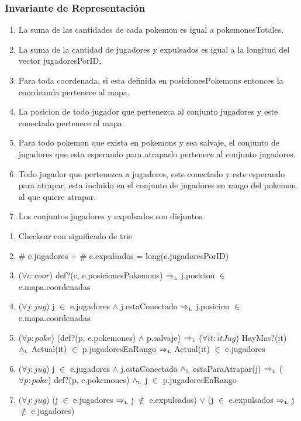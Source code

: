 \begin{Representacion}
\subsubsection{Invariante de Representación}
	\begin{enumerate}
		\item La suma de las cantidades de cada pokemon es igual a pokemonesTotales.
		\item La suma de la cantidad de jugadores y expulsados es igual a la longitud del vector jugadoresPorID.
		\item Para toda coordenada, si esta definida en posicionesPokemons entonces la coordeanda pertenece al mapa.
		\item La posicion de todo jugador que pertenezca al conjunto jugadores y este conectado pertenece al mapa.
		\item Para todo pokemon que exista en pokemons y sea salvaje, el conjunto de jugadores que esta esperando para atraparlo pertenece al conjunto jugadores.
		\item Todo jugador que pertenezca a jugadores, este conectado y este esperando para atrapar, esta incluido en el conjunto de jugadores en rango del pokemon al que quiere atrapar.
		\item Los conjuntos jugadores y expulsados son disjuntos.
	\end{enumerate}
	
	\begin{enumerate}
		\item Checkear con significado de trie
		\item \# e.jugadores + \# e.expulsados = long(e.jugadoresPorID)
		\item ($\forall c : coor$) def?(c, e.posicionesPokemons) $\Rightarrow_{\mathrm{\scriptscriptstyle{L}}}$ j.posicion $\in$ e.mapa.coordenadas
		\item ($\forall j : jug$) j $\in$ e.jugadores $\land$ j.estaConectado $\Rightarrow_{\mathrm{\scriptscriptstyle{L}}}$ j.posicion $\in$ e.mapa.coordenadas
		\item ($\forall p : poke$) (def?(p, e.pokemones) $\land$ p.salvaje) $\Rightarrow_{\mathrm{\scriptscriptstyle{L}}}$ ($\forall it : itJug$) HayMas?(it) $\land_{\mathrm{\scriptscriptstyle{L}}}$ Actual(it) $\in$ p.jugadoresEnRango $\Rightarrow_{\mathrm{\scriptscriptstyle{L}}}$ Actual(it) $\in$ e.jugadores
		\item ($\forall j : jug$) j $\in$ e.jugadores $\land$ j.estaConectado $\land_{\mathrm{\scriptscriptstyle{L}}}$ estaParaAtrapar(j) $\Rightarrow_{\mathrm{\scriptscriptstyle{L}}}$ ($\forall p : poke$) def?(p, e.pokemones) $\land_{\mathrm{\scriptscriptstyle{L}}}$ j $\in$ p.jugadoresEnRango
		\item ($\forall j : jug$) (j $\in$ e.jugadores $\Rightarrow_{\mathrm{\scriptscriptstyle{L}}}$ j $\notin$ e.expulsados) $\lor$ (j $\in$ e.expulsados $\Rightarrow_{\mathrm{\scriptscriptstyle{L}}}$ j $\notin$ e.jugadores)
		

\end{enumerate}
\end{Representacion}
